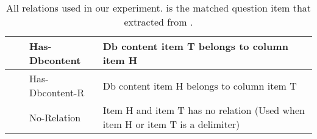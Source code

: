 \documentclass[11pt]{article}
\begin{document}
\begin{table*}
{\begin{tabular}{llll}
                     &                  & Has-Dbcontent                & Db content item T belongs to column item H                                                                      \\ \midrule
                     &                  & Has-Dbcontent-R              & Db content item H belongs to column item T                                                                       \\ \midrule
                  &               & No-Relation                  & Item H and  item T has no relation (Used when item H or item T is a delimiter)                                                        \\ 
    \bottomrule
    \end{tabular}
    }
\caption{All relations used in our experiment.  is the matched question item that extracted from . }
\label{tab:all_relations}
\end{table*}
\end{document}

